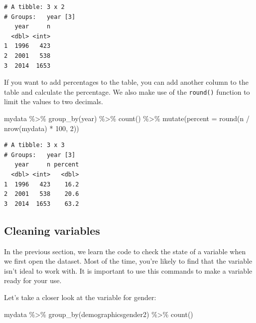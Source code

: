 \documentclass[
]{book}
\newenvironment{Shaded}{\begin{snugshade}}{\end{snugshade}}
\newcommand{\AttributeTok}[1]{\textcolor[rgb]{0.77,0.63,0.00}{#1}}
\newcommand{\DecValTok}[1]{\textcolor[rgb]{0.00,0.00,0.81}{#1}}
\newcommand{\FunctionTok}[1]{\textcolor[rgb]{0.00,0.00,0.00}{#1}}
\newcommand{\NormalTok}[1]{#1}
\newcommand{\SpecialCharTok}[1]{\textcolor[rgb]{0.00,0.00,0.00}{#1}}
\begin{document}
\begin{verbatim}
# A tibble: 3 x 2
# Groups:   year [3]
   year     n
  <dbl> <int>
1  1996   423
2  2001   538
3  2014  1653
\end{verbatim}

If you want to add percentages to the table, you can add another column to the table and calculate the percentage. We also make use of the \texttt{round()} function to limit the values to two decimals.

\begin{Shaded}
\begin{Highlighting}[]
\NormalTok{mydata }\SpecialCharTok{\%\textgreater{}\%}
  \FunctionTok{group\_by}\NormalTok{(year) }\SpecialCharTok{\%\textgreater{}\%}
  \FunctionTok{count}\NormalTok{() }\SpecialCharTok{\%\textgreater{}\%}
  \FunctionTok{mutate}\NormalTok{(}\AttributeTok{percent =} \FunctionTok{round}\NormalTok{(n }\SpecialCharTok{/} \FunctionTok{nrow}\NormalTok{(mydata) }\SpecialCharTok{*} \DecValTok{100}\NormalTok{, }\DecValTok{2}\NormalTok{))}
\end{Highlighting}
\end{Shaded}

\begin{verbatim}
# A tibble: 3 x 3
# Groups:   year [3]
   year     n percent
  <dbl> <int>   <dbl>
1  1996   423    16.2
2  2001   538    20.6
3  2014  1653    63.2
\end{verbatim}

\hypertarget{cleaning-variables}{%
\subsection*{Cleaning variables}\label{cleaning-variables}}

In the previous section, we learn the code to check the state of a variable when we first open the dataset. Most of the time, you're likely to find that the variable isn't ideal to work with. It is important to use this commands to make a variable ready for your use.

Let's take a closer look at the variable for gender:

\begin{Shaded}
\begin{Highlighting}[]
\NormalTok{mydata }\SpecialCharTok{\%\textgreater{}\%}
  \FunctionTok{group\_by}\NormalTok{(demographicsgender2) }\SpecialCharTok{\%\textgreater{}\%}
  \FunctionTok{count}\NormalTok{()}
\end{Highlighting}
\end{Shaded}
\end{document}
